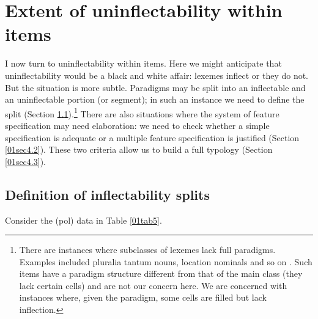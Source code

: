 \documentclass[output=paper,colorlinks,citecolor=brown]{langscibook}
\begin{document}
\section{Extent of uninflectability within items} \label{01sec4}

I now turn to uninflectability within items. Here we might anticipate that uninflectability would be a black and white affair: lexemes inflect or they do not. But the situation is more subtle. Paradigms may be split into an inflectable and an uninflectable portion (or segment); in such an instance we need to define the split (Section \ref{01sec4.1}).\footnote{There are instances where subclasses of lexemes lack full paradigms. Examples included pluralia tantum nouns, location nominals and so on \citep[71--74, 79]{baermanbrowncorbett2017}. Such items have a paradigm structure different from that of the main class (they lack certain cells) and are not our concern here. We are concerned with instances where, given the paradigm, some cells are filled but lack inflection.} There are also situations where the system of feature specification may need elaboration: we need to check whether a simple specification is adequate or a multiple feature specification is justified (Section \ref{01sec4.2}). These two criteria allow us to build a full typology (Section \ref{01sec4.3}).

\subsection{Definition of inflectability splits} \label{01sec4.1}

Consider the  (pol) data in Table \ref{01tab5}.
\end{document}
